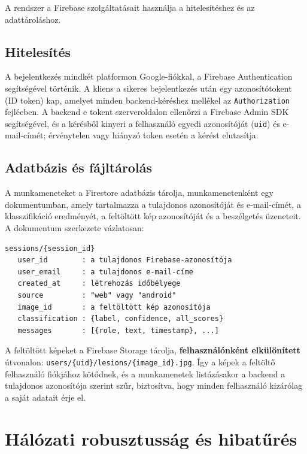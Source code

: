 A rendszer a Firebase szolgáltatásait \cite{firebase} használja a
hitelesítéshez és az adattároláshoz.

\subsection{Hitelesítés}

A bejelentkezés mindkét platformon Google-fiókkal, a Firebase Authentication
segítségével történik. A kliens a sikeres bejelentkezés után egy
azonosító\-tokent (ID token) kap, amelyet minden backend-kéréshez mellékel az
\texttt{Authorization} fejlécben. A backend e tokent szerveroldalon ellenőrzi a
Firebase Admin SDK segítségével, és a kérésből kinyeri a felhasználó egyedi
azonosítóját (\texttt{uid}) és e-mail-címét; érvénytelen vagy hiányzó token
esetén a kérést elutasítja.

\subsection{Adatbázis és fájltárolás}

A munkameneteket a Firestore adatbázis tárolja, munkamenetenként egy
dokumentumban, amely tartalmazza a tulajdonos azonosítóját és e-mail-címét, a
klasszifikáció eredményét, a feltöltött kép azonosítóját és a beszélgetés
üzeneteit. A dokumentum szerkezete vázlatosan:

\begin{verbatim}
sessions/{session_id}
   user_id        : a tulajdonos Firebase-azonosítója
   user_email     : a tulajdonos e-mail-címe
   created_at     : létrehozás időbélyege
   source         : "web" vagy "android"
   image_id       : a feltöltött kép azonosítója
   classification : {label, confidence, all_scores}
   messages       : [{role, text, timestamp}, ...]
\end{verbatim}

A feltöltött képeket a Firebase Storage tárolja, \textbf{felhasználónként
elkülönített} útvonalon: \texttt{users/\{uid\}/lesions/\{image\_id\}.jpg}. Így a
képek a feltöltő felhasználó fiókjához kötődnek, és a munkamenetek listázásakor a
backend a tulajdonos azonosítója szerint szűr, biztosítva, hogy minden
felhasználó kizárólag a saját adatait érje el.

\section{Hálózati robusztusság és hibatűrés}

